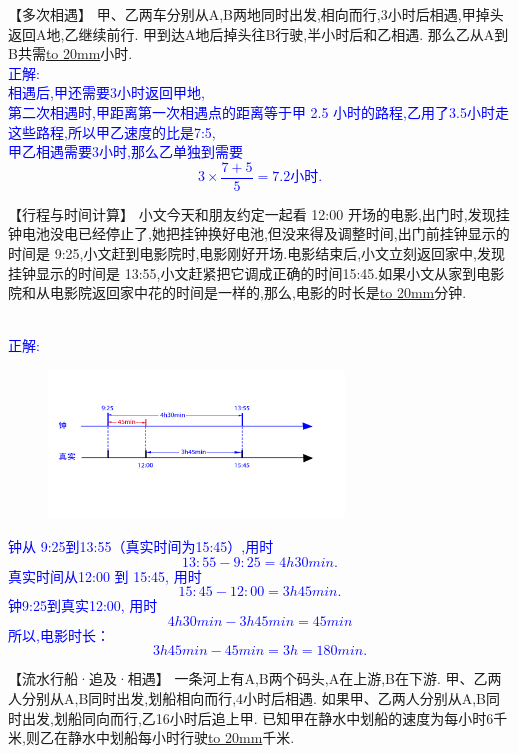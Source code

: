 \item {
    【多次相遇】
    甲、乙两车分别从A,B两地同时出发,相向而行,3小时后相遇,甲掉头返回A地,乙继续前行. 甲到达A地后掉头往B行驶,半小时后和乙相遇. 那么乙从A到B共需\underline{\hbox to 20mm{}}小时.
    \ifshowSolution 
        \fangsong{}\textcolor{blue}{
            \\正解:\\ 
                相遇后,甲还需要3小时返回甲地,\\
                第二次相遇时,甲距离第一次相遇点的距离等于甲 2.5 小时的路程,乙用了3.5小时走这些路程,所以甲乙速度的比是7:5,\\
                甲乙相遇需要3小时,那么乙单独到需要
                $$3\times \frac{7+5}{5} = 7.2小时.$$
        }
    \else
        \vspace{1cm}
    \fi
}

\item {
    【行程与时间计算】
    小文今天和朋友约定一起看 12:00 开场的电影,出门时,发现挂钟电池没电已经停止了,她把挂钟换好电池,但没来得及调整时间,出门前挂钟显示的时间是 9:25,小文赶到电影院时,电影刚好开场.电影结束后,小文立刻返回家中,发现挂钟显示的时间是 13:55,小文赶紧把它调成正确的时间15:45.如果小文从家到电影院和从电影院返回家中花的时间是一样的,那么,电影的时长是\underline{\hbox to 20mm{}}分钟.
    \ifshowSolution 
        \fangsong{}\textcolor{blue}{
            \\正解:
            \begin{figure}[H] 
                \centering
                \includegraphics[width=0.7\textwidth]{./pics/Chapter_3/seikai_8.png}
            \end{figure}
            钟从 9:25到13:55（真实时间为15:45）,用时 
            $$13:55 - 9:25 = 4h 30min.$$
            真实时间从12:00 到 15:45, 用时
            $$15:45 - 12:00 = 3h 45min.$$
            钟9:25到真实12:00, 用时
            $$
                4h 30min - 3h 45min = 45min
            $$
            所以,电影时长：
            $$3h 45min - 45min = 3h = 180min.$$
        }
    \else
        \vspace{1cm}
    \fi
}

\item {
    【流水行船·追及·相遇】
    一条河上有A,B两个码头,A在上游,B在下游. 甲、乙两人分别从A,B同时出发,划船相向而行,4小时后相遇. 如果甲、乙两人分别从A,B同时出发,划船同向而行,乙16小时后追上甲. 已知甲在静水中划船的速度为每小时6千米,则乙在静水中划船每小时行驶\underline{\hbox to 20mm{}}千米.
    \vspace{2cm}
}
